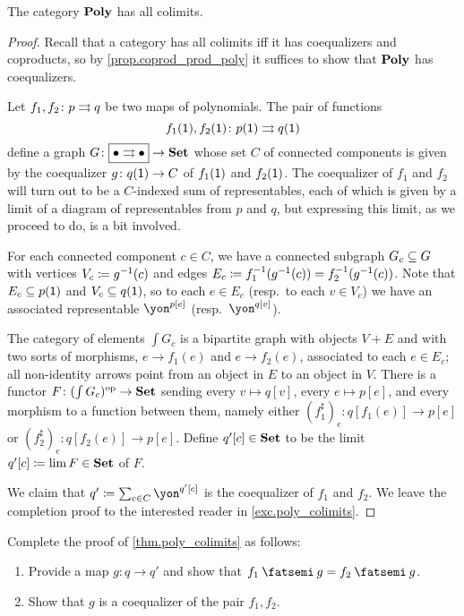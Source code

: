 \documentclass[Book-Poly]{subfiles}
\begin{document}
\begin{theorem}\label{thm.poly_colimits}
The category $\poly$ has all colimits.
\end{theorem}
\begin{proof}
Recall that a category has all colimits iff it has coequalizers and coproducts, so by \cref{prop.coprod_prod_poly} it suffices to show that $\poly$ has coequalizers.

Let $f_1,f_2\colon p\tto q$ be two maps of polynomials. The pair of functions
\[f_1(\1),f_2(\1)\colon p(\1)\tto q(\1)\] 
define a graph $G\colon\fbox{$\bullet\tto\bullet$}\to\smset$ whose set $C$ of connected components is given by the coequalizer $g\colon q(\1)\to C$ of $f_1(\1)$ and $f_2(\1)$. The coequalizer of $f_1$ and $f_2$ will turn out to be a $C$-indexed sum of representables, each of which is given by a limit of a diagram of representables from $p$ and $q$, but expressing this limit, as we proceed to do, is a bit involved.

For each connected component $c\in C$, we have a connected subgraph $G_c\ss G$ with vertices $V_c\coloneqq g\inv(c)$ and edges $E_c\coloneqq f_1\inv(g\inv(c))=f_2\inv(g\inv(c))$. Note that $E_c\ss p(\1)$ and $V_c\ss q(\1)$, so to each $e\in E_c$ (resp.\ to each $v\in V_c$) we have an associated representable $\yon^{p[e]}$ (resp.\ $\yon^{q[v]}$).

The category of elements $\int G_c$ is a bipartite graph with objects $V+E$ and with two sorts of morphisms, $e\to f_1(e)$ and $e\to f_2(e)$, associated to each $e\in E_c$; all non-identity arrows point from an object in $E$ to an object in $V$. There is a functor $F\colon(\int G_c)\op\to\smset$ sending every $v\mapsto q[v]$, every $e\mapsto p[e]$, and every morphism to a function between them, namely either $(f_1^\sharp)_e\colon q[f_1(e)]\to p[e]$ or $(f_2^\sharp)_e\colon q[f_2(e)]\to p[e]$. Define $q'[c]\in\smset$ to be the limit $q'[c]\coloneqq\lim F\in\smset$ of $F$.

We claim that $q'\coloneqq\sum_{c\in C}\yon^{q'[c]}$ is the coequalizer of $f_1$ and $f_2$. We leave the completion proof to the interested reader in \cref{exc.poly_colimits}.
\end{proof}

\begin{exercise}\label{exc.poly_colimits}
Complete the proof of \cref{thm.poly_colimits} as follows:
\begin{enumerate}
	\item Provide a map $g\colon q\to q'$ and show that $f_1\then g=f_2\then g$.
	\item Show that $g$ is a coequalizer of the pair $f_1,f_2$.
\qedhere
\end{enumerate}
\end{exercise}
\end{document}
